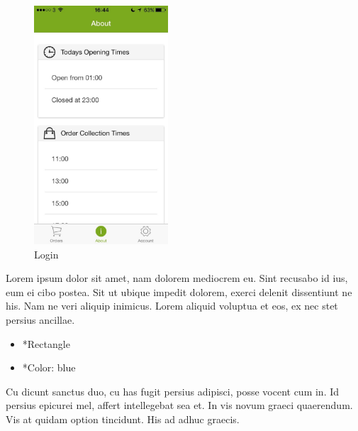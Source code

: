 \begin{minipage}{5cm}
	\begin{figure}[H]
		\includegraphics[width=5cm]{img/mobile-app/screen-shots/IMG_2911.jpg}
		\caption{Login}
	\end{figure}
\end{minipage} \hfill
\begin{minipage}{0.55\textwidth}
	Lorem ipsum dolor sit amet, nam dolorem mediocrem eu. Sint recusabo id ius, eum ei cibo postea. Sit ut ubique impedit dolorem, exerci delenit dissentiunt ne his. Nam ne veri aliquip inimicus. Lorem aliquid voluptua et eos, ex nec stet persius ancillae.
	\begin{itemize}
		\item *Rectangle
		\item *Color: blue
	\end{itemize}
	Cu dicunt sanctus duo, cu has fugit persius adipisci, posse vocent cum in. Id persius epicurei mel, affert intellegebat sea et. In vis novum graeci quaerendum. Vis at quidam option tincidunt. His ad adhuc graecis.
\end{minipage}


